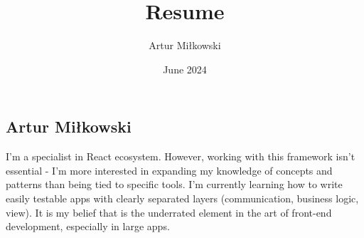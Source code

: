 \documentclass{my_cv}
\title{Resume}
\author{Artur Miłkowski}
\date{June 2024}
\begin{document}
\begin{multicols}{3}
    \section{}
    \columnbreak
    \section{}
    \columnbreak
    \section{ }
\end{multicols}

\begin{multicols}{2}
    \section{\Huge \textbf{Artur \newline Miłkowski}}

    \columnbreak
    \begin{spacing}{1.5}
        I’m a specialist in React ecosystem. However, working with this framework isn’t essential - I’m more interested in expanding my knowledge of concepts and patterns than being tied to specific tools. I’m currently learning how to write easily testable apps with clearly separated layers (communication, business logic, view). It is my belief that is the underrated element in the art of front-end development, especially in large apps.
    \end{spacing}
\end{multicols}

\vspace{1em}
\setlength{\columnsep}{1cm}
\end{document}
